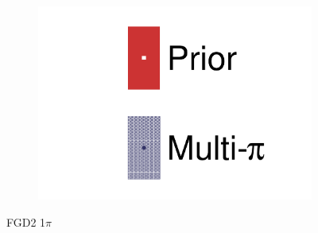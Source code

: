 \begin{figure}[h]
\begin{subfigure}[t]{0.32\textwidth}
	\end{subfigure}
	\begin{subfigure}[t]{0.32\textwidth}
		\includegraphics[width=\textwidth,page=41, trim={0mm 0mm 0mm 0mm}, clip]{figures/mach3/2018/data/2018a_FixedCov_RedCov_Mpi_Data_merge_drawPar_withDet}
	\end{subfigure}
	\caption{FGD2 1$\pi$}
	\label{fig:data_multipi_det_fdg2_cc1pi}
\end{figure}


